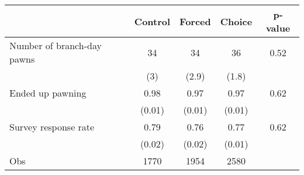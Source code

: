 \begin{tabular}{lcccc}
\toprule
& Control & Forced & Choice & p-value \\
\midrule
\midrule
Number of branch-day pawns & 34    & 34    & 36    & 0.52 \\
      & (3)   & (2.9) & (1.8) &  \\
\multicolumn{1}{p{12.82em}}{Ended up pawning} & 0.98  & 0.97  & 0.97  & 0.62 \\
      & (0.01) & (0.01) & (0.01) &  \\
Survey response rate & 0.79  & 0.76  & 0.77  & 0.62 \\
      & (0.02) & (0.02) & (0.01) &  \\
\midrule
Obs   & 1770  & 1954  & 2580  &  \\
\bottomrule
\bottomrule
\end{tabular}%
